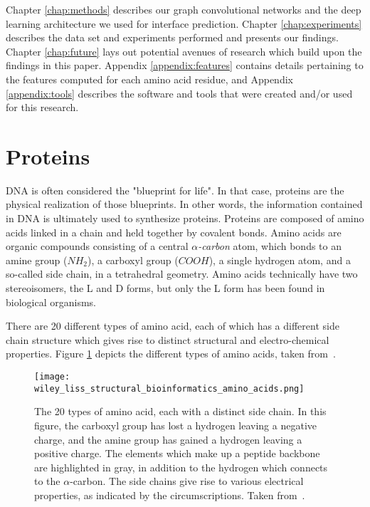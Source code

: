 Chapter \ref{chap:methods} describes our graph convolutional networks and the deep learning architecture we used for interface prediction. Chapter \ref{chap:experiments} describes the data set and experiments performed and presents our findings. Chapter \ref{chap:future} lays out potential avenues of research which build upon the findings in this paper. Appendix \ref{appendix:features} contains details pertaining to the features computed for each amino acid residue, and Appendix \ref{appendix:tools} describes the software and tools that were created and/or used for this research.

\section{Proteins}

DNA is often considered the "blueprint for life". 
In that case, proteins are the physical realization of those blueprints.
In other words, the information contained in DNA is ultimately used to synthesize proteins.
Proteins are composed of amino acids linked in a chain and held together by covalent bonds.
Amino acids are organic compounds consisting of a central \textit{$\alpha$-carbon} atom, which bonds to an amine group ($NH_2$), a carboxyl group ($COOH$), a single hydrogen atom, and a so-called side chain, in a tetrahedral geometry.
Amino acids technically have two stereoisomers, the L and D forms, but only the L form has been found in biological organisms.

There are 20 different types of amino acid, each of which has a different side chain structure which gives rise to distinct structural and electro-chemical properties. 
Figure \ref{fig:aminoacids} depicts the different types of amino acids, taken from~\cite{scheeffink2003}.


\begin{figure}
	\centering
	\texttt{[image: wiley\_liss\_structural\_bioinformatics\_amino\_acids.png]}
	\caption{The 20 types of amino acid, each with a distinct side chain. In this figure, the carboxyl group has lost a hydrogen leaving a negative charge, and the amine group has gained a hydrogen leaving a positive charge. The elements which make up a peptide backbone are highlighted in gray, in addition to the hydrogen which connects to the $\alpha$-carbon. The side chains give rise to various electrical properties, as indicated by the circumscriptions. Taken from~\cite{scheeffink2003}.}
	\label{fig:aminoacids}
\end{figure}

